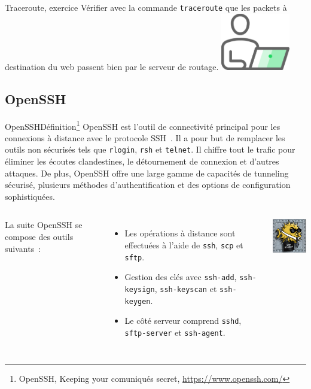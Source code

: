 \documentclass{beamer}
\begin{document}
    \begin{frame}{Traceroute, exercice \execcounterdispinc}
        Vérifier avec la commande \lstinline{traceroute} que les packets à destination du web passent bien par le serveur de routage.
        \bigbreak
        \centering
        \includegraphics[width=3cm]{image/guy-in-front-of-desktop}
    \end{frame}

    \subsection{OpenSSH}\label{subsec:openssh2}

    \begin{frame}{OpenSSH}{Définition\footnote{\label{openssh-site}OpenSSH, Keeping your comuniqués secret, \url{https://www.openssh.com/}}}
        OpenSSH est l'outil de connectivité principal pour les connexions à distance avec le protocole SSH~.
        Il a pour but de remplacer les outils non sécurisés tels que \lstinline{rlogin}, \lstinline{rsh} et \lstinline{telnet}.
        Il chiffre tout le trafic pour éliminer les écoutes clandestines, le détournement de connexion et d'autres attaques.
        De plus, OpenSSH offre une large gamme de capacités de tunneling sécurisé, plusieurs méthodes d'authentification et des options de configuration sophistiquées.

        \begin{columns}
            La suite OpenSSH se compose des outils suivants~:
            \begin{itemize}
                \item Les opérations à distance sont effectuées à l'aide de \lstinline{ssh}, \lstinline{scp} et \lstinline{sftp}.
                \item Gestion des clés avec \lstinline{ssh-add}, \lstinline{ssh-keysign}, \lstinline{ssh-keyscan} et \lstinline{ssh-keygen}.
                \item Le côté serveur comprend \lstinline{sshd}, \lstinline{sftp-server} et \lstinline{ssh-agent}.
            \end{itemize}
            \includegraphics[width=3cm]{image/openssh}
        \end{columns}
    \end{frame}
\end{document}
